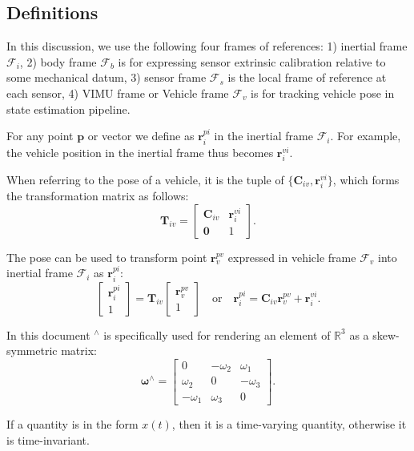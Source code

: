 \documentclass[conference]{IEEEtran}
\begin{document}
\subsection{Definitions}

In this discussion, we use the following four frames of references: 1) inertial frame $\bm{\mathcal{F}}_i$, 2) body frame $\bm{\mathcal{F}}_b$ is for expressing sensor extrinsic calibration relative to some mechanical datum, 3) sensor frame $\bm{\mathcal{F}}_s$ is the local frame of reference at each sensor, 4) VIMU frame or Vehicle frame $\bm{\mathcal{F}}_v$ is for tracking vehicle pose in state estimation pipeline.

For any point $\textbf{p}$ or vector we define as $\textbf{r}_i^{pi}$ in the inertial frame $\bm{\mathcal{F}}_i$. For example, the vehicle position in the inertial frame thus becomes $\textbf{r}_i^{vi}$.

When referring to the pose of a vehicle, it is the tuple of $\{\textbf{C}_{iv}, \textbf{r}_i^{vi}\}$, which forms the transformation matrix as follows:
$$
\textbf{T}_{iv} = \left[\begin{matrix}
    \textbf{C}_{iv} & \textbf{r}_i^{vi} \\
    \textbf{0} & 1
\end{matrix}\right].
$$

The pose can be used to transform point $\textbf{r}_v^{pv}$ expressed in vehicle frame $\bm{\mathcal{F}}_v$ into inertial frame $\bm{\mathcal{F}}_i$ as $\textbf{r}_i^{pi}$:
$$
\left[\begin{matrix} \textbf{r}_i^{pi} \\ 1 \end{matrix}\right]
    = \textbf{T}_{iv} \left[\begin{matrix} \textbf{r}_v^{pv} \\ 1 \end{matrix}\right]
\quad \text{or} \quad
\textbf{r}_i^{pi} = \textbf{C}_{iv} \textbf{r}_v^{pv} + \textbf{r}_i^{vi}.
$$

In this document $^\wedge$ is specifically used for rendering an element of $\mathbb{R}^3$ as a skew-symmetric matrix:
$$
\bm{\omega}^\wedge = \left[\begin{matrix}
    0 & -\omega_2 & \omega_1 \\
    \omega_2 & 0 & -\omega_3 \\
    -\omega_1 & \omega_3 & 0
\end{matrix}\right].
$$

If a quantity is in the form $x(t)$, then it is a time-varying quantity, otherwise it is time-invariant.
\end{document}
